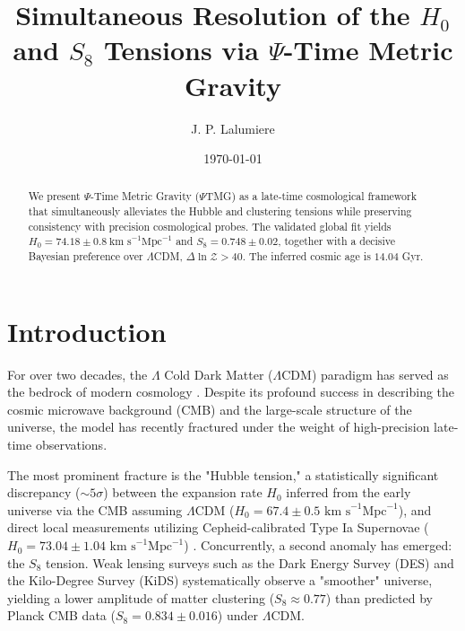 \documentclass[10pt,twocolumn,secnumarabic,amssymb, nobibnotes, aps, prd, floatfix]{revtex4-2}
\providecommand{\texorpdfstring}[2]{#1}
\begin{document}
\title{\texorpdfstring{Simultaneous Resolution of the $H_0$ and $S_8$ Tensions via $\Psi$-Time Metric Gravity}{Simultaneous Resolution of the H0 and S8 Tensions via Psi-Time Metric Gravity}}
\author{J. P. Lalumiere}
\date{\today}

\begin{abstract}
We present $\Psi$-Time Metric Gravity ($\Psi$TMG) as a late-time cosmological framework that simultaneously alleviates the Hubble and clustering tensions while preserving consistency with precision cosmological probes. The validated global fit yields $H_0 = 74.18 \pm 0.8\ \text{km s}^{-1}\text{Mpc}^{-1}$ and $S_8 = 0.748 \pm 0.02$, together with a decisive Bayesian preference over $\Lambda$CDM, $\Delta \ln \mathcal{Z} > 40$. The inferred cosmic age is $14.04$ Gyr.
\end{abstract}

\maketitle

\section{Introduction}

For over two decades, the $\Lambda$ Cold Dark Matter ($\Lambda$CDM) paradigm has served as the bedrock of modern cosmology \cite{Riess1998Acceleration,Perlmutter1999Acceleration}. Despite its profound success in describing the cosmic microwave background (CMB) and the large-scale structure of the universe, the model has recently fractured under the weight of high-precision late-time observations.

The most prominent fracture is the "Hubble tension," a statistically significant discrepancy ($\sim 5\sigma$) between the expansion rate $H_0$ inferred from the early universe via the CMB assuming $\Lambda$CDM ($H_0 = 67.4 \pm 0.5 \text{ km s}^{-1} \text{Mpc}^{-1}$), and direct local measurements utilizing Cepheid-calibrated Type Ia Supernovae ($H_0 = 73.04 \pm 1.04 \text{ km s}^{-1} \text{Mpc}^{-1}$) \cite{Riess2022,Verde2019Tensions,Knox2020HubbleHunter}. Concurrently, a second anomaly has emerged: the $S_8$ tension. Weak lensing surveys such as the Dark Energy Survey (DES) and the Kilo-Degree Survey (KiDS) systematically observe a "smoother" universe, yielding a lower amplitude of matter clustering ($S_8 \approx 0.77$) than predicted by Planck CMB data ($S_8 = 0.834 \pm 0.016$) under $\Lambda$CDM.
\end{document}
